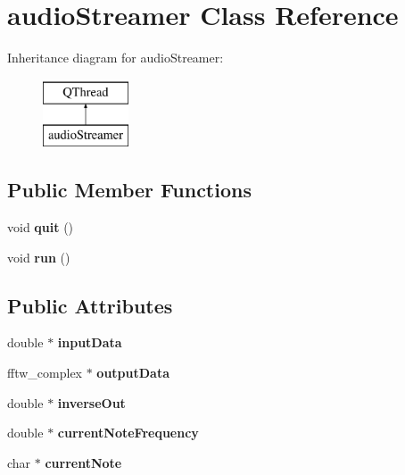 \hypertarget{classaudioStreamer}{\section{audio\-Streamer Class Reference}
\label{classaudioStreamer}
}
Inheritance diagram for audio\-Streamer\-:\begin{figure}[H]
\begin{center}
\leavevmode
\includegraphics[height=2.000000cm]{classaudioStreamer}
\end{center}
\end{figure}
\subsection*{Public Member Functions}
\begin{DoxyCompactItemize}
\item 
\hypertarget{classaudioStreamer_aa236fda0774b738734c2c62b92a912c3}{void {\bfseries quit} ()}\label{classaudioStreamer_aa236fda0774b738734c2c62b92a912c3}

\item 
\hypertarget{classaudioStreamer_a7488bec15fe99d666b66dd5fa45df74e}{void {\bfseries run} ()}\label{classaudioStreamer_a7488bec15fe99d666b66dd5fa45df74e}

\end{DoxyCompactItemize}
\subsection*{Public Attributes}
\begin{DoxyCompactItemize}
\item 
\hypertarget{classaudioStreamer_a86d950b9bf7cebbd955b2f70a28133a0}{double $\ast$ {\bfseries input\-Data}}\label{classaudioStreamer_a86d950b9bf7cebbd955b2f70a28133a0}

\item 
\hypertarget{classaudioStreamer_abbf74a17a02dba11130897c10cf661db}{fftw\-\_\-complex $\ast$ {\bfseries output\-Data}}\label{classaudioStreamer_abbf74a17a02dba11130897c10cf661db}

\item 
\hypertarget{classaudioStreamer_aa78f221b974bfe365bb430e26c951777}{double $\ast$ {\bfseries inverse\-Out}}\label{classaudioStreamer_aa78f221b974bfe365bb430e26c951777}

\item 
\hypertarget{classaudioStreamer_a7c2310503ad50698933184fab223fd25}{double $\ast$ {\bfseries current\-Note\-Frequency}}\label{classaudioStreamer_a7c2310503ad50698933184fab223fd25}

\item 
\hypertarget{classaudioStreamer_a943371f31102ab0f493addfbd685f210}{char $\ast$ {\bfseries current\-Note}}\label{classaudioStreamer_a943371f31102ab0f493addfbd685f210}

\end{DoxyCompactItemize}


